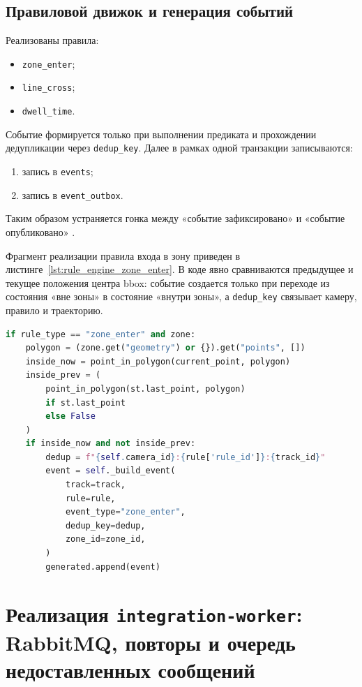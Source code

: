 \subsection{Правиловой движок и генерация событий}

Реализованы правила:
\begin{itemize}
    \item \texttt{zone\_enter};
    \item \texttt{line\_cross};
    \item \texttt{dwell\_time}.
\end{itemize}

Событие формируется только при выполнении предиката и прохождении дедупликации через \texttt{dedup\_key}. Далее в рамках одной транзакции записываются:
\begin{enumerate}
    \item запись в \texttt{events};
    \item запись в \texttt{event\_outbox}.
\end{enumerate}
Таким образом устраняется гонка между «событие зафиксировано» и «событие опубликовано» \cite{transactional_outbox,richardson_microservices}.

Фрагмент реализации правила входа в зону приведен в листинге~\ref{lst:rule_engine_zone_enter}. В коде явно сравниваются предыдущее и текущее положения центра bbox: событие создается только при переходе из состояния «вне зоны» в состояние «внутри зоны», а \texttt{dedup\_key} связывает камеру, правило и траекторию.

\begin{lstlisting}[language=Python,caption={Фрагмент реализации правила \texttt{zone\_enter}},label={lst:rule_engine_zone_enter}]
if rule_type == "zone_enter" and zone:
    polygon = (zone.get("geometry") or {}).get("points", [])
    inside_now = point_in_polygon(current_point, polygon)
    inside_prev = (
        point_in_polygon(st.last_point, polygon)
        if st.last_point
        else False
    )
    if inside_now and not inside_prev:
        dedup = f"{self.camera_id}:{rule['rule_id']}:{track_id}"
        event = self._build_event(
            track=track,
            rule=rule,
            event_type="zone_enter",
            dedup_key=dedup,
            zone_id=zone_id,
        )
        generated.append(event)
\end{lstlisting}

\section{Реализация \texttt{integration-worker}: RabbitMQ, повторы и очередь недоставленных сообщений}

